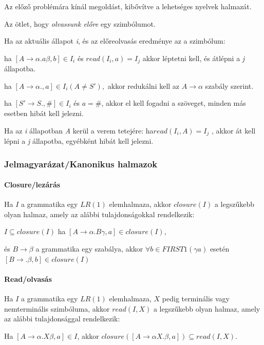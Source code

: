 \documentclass[margin=0px]{article}
\begin{document}
	Az előző problémára kínál megoldást, kibővítve a lehetséges nyelvek halmazát.
	
	Az ötlet, hogy \textit{olvassunk előre} egy szimbólumot.
	
	Ha az aktuális állapot \textit{i}, és az előreolvasás eredménye az a
	szimbólum:
	
	ha $ [A	\rightarrow \alpha.a\beta, b] \in I_i $ és $read(I_i, a) = I_j$
	akkor léptetni kell, és átlépni a \textit{j} állapotba.
	
	
	ha $ [A	\rightarrow \alpha., a] \in I_i (A \neq S'), $
	akkor redukálni kell az $ A \rightarrow \alpha $ szabály szerint.
	
	
	
	
	ha $ [S' \rightarrow S., \#] \in I_i $ és $ a = \# $, akkor el kell fogadni a szöveget,	minden más esetben hibát kell jelezni.
	
	Ha az \textit{i} állapotban \textit{A} kerül a verem tetejére:
		ha$  read(I_i,A) =	I_j $ , 
	akkor át kell lépni a \textit{j} állapotba,	egyébként hibát kell jelezni.

	
	 
\subsubsection{Jelmagyarázat/Kanonikus halmazok}
	
	\paragraph{Closure/lezárás}
	
	Ha $ I $ a grammatika egy $ LR(1) $ elemhalmaza, akkor $ closure(I) $ a
	legszűkebb olyan halmaz, amely az alábbi tulajdonságokkal
	rendelkezik:
	
	$ I \subseteq closure(I) $ ha $ [A \rightarrow \alpha.B\gamma,a] \in closure(I) $, 
	
	és $ B \rightarrow \beta $ a grammatika egy szabálya,
	 akkor $ \forall b \in FIRST1(\gamma{}a) $ esetén $ [B \rightarrow .\beta,b] \in closure(I) $
	
	
	\paragraph{Read/olvasás}
	Ha $ I $ a grammatika egy $ LR(1) $ elemhalmaza, $ X $ pedig terminális	vagy nemterminális szimbóluma, akkor $ read(I, X) $ a legszűkebb olyan halmaz, amely az alábbi tulajdonsággal rendelkezik:
	
	Ha $ [A \rightarrow \alpha. X\beta,a] \in I $, akkor $ closure([ A \rightarrow \alpha X.\beta,a]) \subseteq read(I, X) $. 
	
\end{document}
